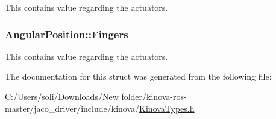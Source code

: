 This contains value regarding the actuators. 

\subsubsection[{\texorpdfstring{Fingers}{Fingers}}]{ Angular\+Position\+::\+Fingers}\hypertarget{struct_angular_position_afdb2a9bede2dde4e8f881175a58e019f}{}\label{struct_angular_position_afdb2a9bede2dde4e8f881175a58e019f}


This contains value regarding the actuators. 



The documentation for this struct was generated from the following file\+:\begin{DoxyCompactItemize}
\item 
C\+:/\+Users/soli/\+Downloads/\+New folder/kinova-\/ros-\/master/jaco\+\_\+driver/include/kinova/\hyperlink{_kinova_types_8h}{Kinova\+Types.\+h}\end{DoxyCompactItemize}
